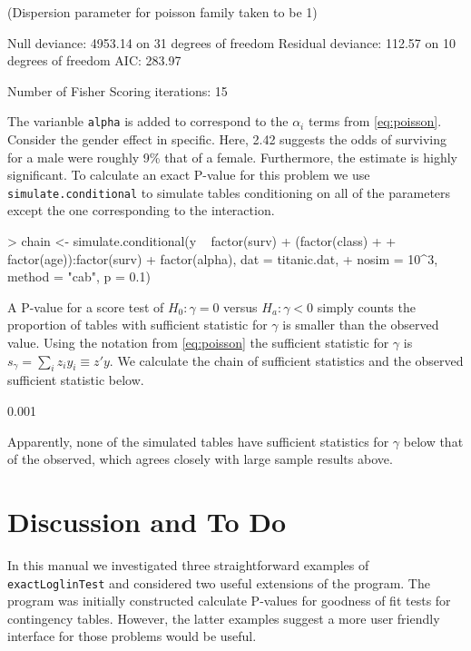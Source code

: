 \documentclass[a4paper]{article}
\begin{document}
\begin{Schunk}
\begin{Soutput}
(Dispersion parameter for poisson family taken to be 1)

    Null deviance: 4953.14  on 31  degrees of freedom
Residual deviance:  112.57  on 10  degrees of freedom
AIC: 283.97

Number of Fisher Scoring iterations: 15
\end{Soutput}
\end{Schunk}

The varianble \texttt{alpha} is added to correspond to the $\alpha_i$
terms from \eqref{eq:poisson}. Consider the gender effect in
specific. Here, 2.42 suggests the odds of surviving for a male were
roughly 9\% that of a female.  Furthermore, the estimate is highly
significant. To calculate an exact P-value for this problem we use
\texttt{simulate.conditional} to simulate tables conditioning on all
of the parameters except the one corresponding to the
 interaction.
\begin{Schunk}
\begin{Sinput}
> chain <- simulate.conditional(y ~ factor(surv) + (factor(class) + 
+     factor(age)):factor(surv) + factor(alpha), dat = titanic.dat, 
+     nosim = 10^3, method = "cab", p = 0.1)
\end{Sinput}
\end{Schunk}


A P-value for a score test of $H_0 : \gamma = 0$ versus $H_a : \gamma
< 0$ simply counts the proportion of tables with sufficient statistic
for $\gamma$ is smaller than the observed value. Using the notation
from \eqref{eq:poisson} the sufficient statistic for $\gamma$ is
$s_\gamma = \sum_i z_i y_i \equiv z' y$. We calculate the chain of
sufficient statistics and the observed sufficient statistic below.
\begin{Schunk}
\begin{Soutput}
[1] 0.001
\end{Soutput}
\end{Schunk}
Apparently, none of the simulated tables have sufficient statistics
for $\gamma$ below that of the observed, which agrees closely with
large sample results above.

\section{Discussion and To Do}
In this manual we investigated three straightforward examples of
\texttt{exactLoglinTest} and considered two useful extensions of the
program. The program was initially constructed calculate P-values for
goodness of fit tests for contingency tables. However, the latter
examples suggest a more user friendly interface for those problems
would be useful.
\end{document}

